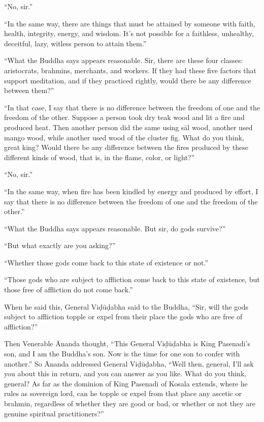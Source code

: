 \documentclass[12pt,openany]{book}%
\begin{document}
“No, sir.” 

“In the same way, there are things that must be attained by someone with faith, health, integrity, energy, and wisdom. It’s not possible for a faithless, unhealthy, deceitful, lazy, witless person to attain them.” 

“What the Buddha says appears reasonable. Sir, there are these four classes: aristocrats, brahmins, merchants, and workers. If they had these five factors that support meditation, and if they practiced rightly, would there be any difference between them?” 

“In that case, I say that there is no difference between the freedom of one and the freedom of the other. Suppose a person took dry teak wood and lit a fire and produced heat. Then another person did the same using \textsanskrit{sāl} wood, another used mango wood, while another used wood of the cluster fig. What do you think, great king? Would there be any difference between the fires produced by these different kinds of wood, that is, in the flame, color, or light?” 

“No, sir.” 

“In the same way, when fire has been kindled by energy and produced by effort, I say that there is no difference between the freedom of one and the freedom of the other.” 

“What the Buddha says appears reasonable. But sir, do gods survive?” 

“But what exactly are you asking?” 

“Whether those gods come back to this state of existence or not.” 

“Those gods who are subject to affliction come back to this state of existence, but those free of affliction do not come back.” 

When he said this, General \textsanskrit{Viḍūḍabha} said to the Buddha, “Sir, will the gods subject to affliction topple or expel from their place the gods who are free of affliction?” 

Then Venerable Ānanda thought, “This General \textsanskrit{Viḍūḍabha} is King Pasenadi’s son, and I am the Buddha’s son. Now is the time for one son to confer with another.” So Ānanda addressed General \textsanskrit{Viḍūḍabha}, “Well then, general, I’ll ask you about this in return, and you can answer as you like. What do you think, general? As far as the dominion of King Pasenadi of Kosala extends, where he rules as sovereign lord, can he topple or expel from that place any ascetic or brahmin, regardless of whether they are good or bad, or whether or not they are genuine spiritual practitioners?” 
\end{document}
